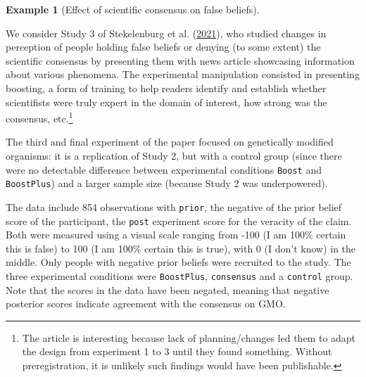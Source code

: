 \documentclass[
  11pt,
  letterpaper,
]{scrbook}
\theoremstyle{definition}
\newtheorem{example}{Example}[chapter]
\theoremstyle{remark}
\begin{document}
\begin{example}[Effect of scientific consensus on false
beliefs]\protect\hypertarget{exm-vanStek}{}\label{exm-vanStek}

We consider Study 3 of Stekelenburg et al.
(\protect\hyperlink{ref-vanStekelenburg:2021}{2021}), who studied
changes in perception of people holding false beliefs or denying (to
some extent) the scientific consensus by presenting them with news
article showcasing information about various phenomena. The experimental
manipulation consisted in presenting boosting, a form of training to
help readers identify and establish whether scientifists were truly
expert in the domain of interest, how strong was the consensus,
etc.\footnote{The article is interesting because lack of
  planning/changes led them to adapt the design from experiment 1 to 3
  until they found something. Without preregistration, it is unlikely
  such findings would have been publishable.}

The third and final experiment of the paper focused on genetically
modified organisms: it is a replication of Study 2, but with a control
group (since there were no detectable difference between experimental
conditions \texttt{Boost} and \texttt{BoostPlus}) and a larger sample
size (because Study 2 was underpowered).

The data include 854 observations with \texttt{prior}, the negative of
the prior belief score of the participant, the \texttt{post} experiment
score for the veracity of the claim. Both were measured using a visual
scale ranging from -100 (I am 100\% certain this is false) to 100 (I am
100\% certain this is true), with 0 (I don't know) in the middle. Only
people with negative prior beliefs were recruited to the study. The
three experimental conditions were \texttt{BoostPlus},
\texttt{consensus} and a \texttt{control} group. Note that the scores in
the data have been negated, meaning that negative posterior scores
indicate agreement with the consensus on GMO.


\end{example}
\end{document}
